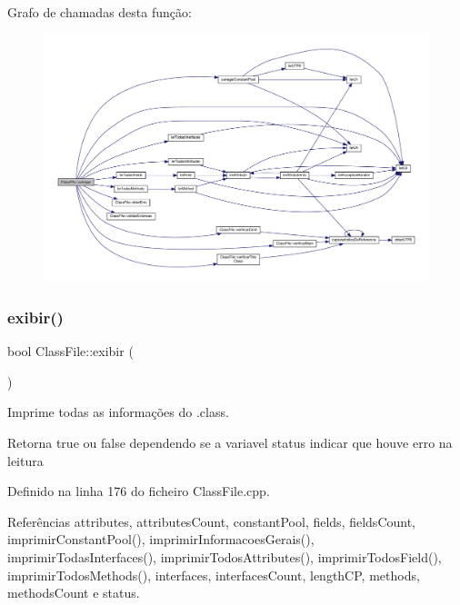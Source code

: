 Grafo de chamadas desta função\+:\nopagebreak
\begin{figure}[H]
\begin{center}
\leavevmode
\includegraphics[width=350pt]{classClassFile_a619e102ada15202ab84981d43362a3e9_cgraph}
\end{center}
\end{figure}
\mbox{\label{classClassFile_a7da7cc6de8de3fc6f27faf3b76f4883a}} 
\subsubsection{\texorpdfstring{exibir()}{exibir()}}
{\footnotesize\ttfamily bool Class\+File\+::exibir (\begin{DoxyParamCaption}{ }\end{DoxyParamCaption})}



Imprime todas as informações do .class. 

\begin{DoxyReturn}{Retorna}
true ou false dependendo se a variavel status indicar que houve erro na leitura 
\end{DoxyReturn}


Definido na linha 176 do ficheiro Class\+File.\+cpp.



Referências attributes, attributes\+Count, constant\+Pool, fields, fields\+Count, imprimir\+Constant\+Pool(), imprimir\+Informacoes\+Gerais(), imprimir\+Todas\+Interfaces(), imprimir\+Todos\+Attributes(), imprimir\+Todos\+Field(), imprimir\+Todos\+Methods(), interfaces, interfaces\+Count, length\+CP, methods, methods\+Count e status.



